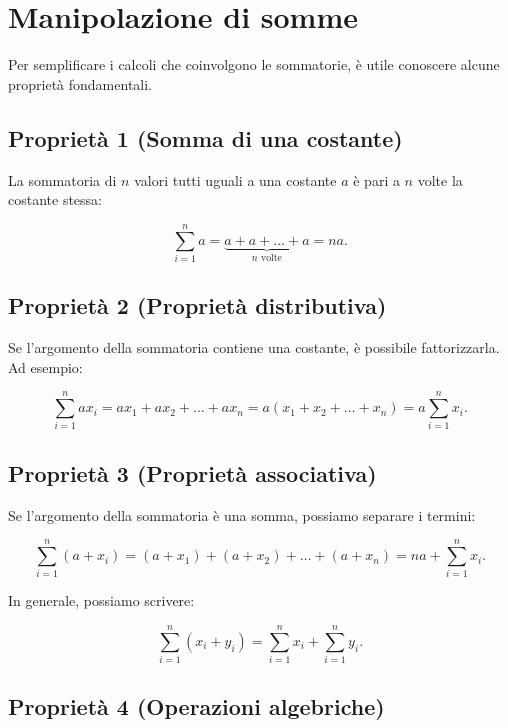 \documentclass[
  italian,
  letterpaper,
  a4paper,
  11pt,
  open=any]{scrbook}
\theoremstyle{plain}
\theoremstyle{definition}
\theoremstyle{definition}
\theoremstyle{remark}
\begin{document}
\section{Manipolazione di somme}\label{manipolazione-di-somme}

Per semplificare i calcoli che coinvolgono le sommatorie, è utile
conoscere alcune proprietà fondamentali.

\subsection{Proprietà 1 (Somma di una
costante)}\label{proprietuxe0-1-somma-di-una-costante}

La sommatoria di \(n\) valori tutti uguali a una costante \(a\) è pari a
\(n\) volte la costante stessa:

\[
\sum_{i=1}^{n} a = \underbrace{a + a + \dots + a}_{n \text{ volte}} = n a.
\]

\subsection{Proprietà 2 (Proprietà
distributiva)}\label{proprietuxe0-2-proprietuxe0-distributiva}

Se l'argomento della sommatoria contiene una costante, è possibile
fattorizzarla. Ad esempio:

\[
\sum_{i=1}^{n} a x_i = a x_1 + a x_2 + \dots + a x_n = a (x_1 + x_2 + \dots + x_n) = a \sum_{i=1}^{n} x_i.
\]

\subsection{Proprietà 3 (Proprietà
associativa)}\label{proprietuxe0-3-proprietuxe0-associativa}

Se l'argomento della sommatoria è una somma, possiamo separare i
termini:

\[
\sum_{i=1}^{n} (a + x_i) = (a + x_1) + (a + x_2) + \dots + (a + x_n) = n a + \sum_{i=1}^{n} x_i.
\]

In generale, possiamo scrivere:

\[
\sum_{i=1}^{n} (x_i + y_i) = \sum_{i=1}^{n} x_i + \sum_{i=1}^{n} y_i.
\]

\subsection{Proprietà 4 (Operazioni
algebriche)}\label{proprietuxe0-4-operazioni-algebriche}
\end{document}
